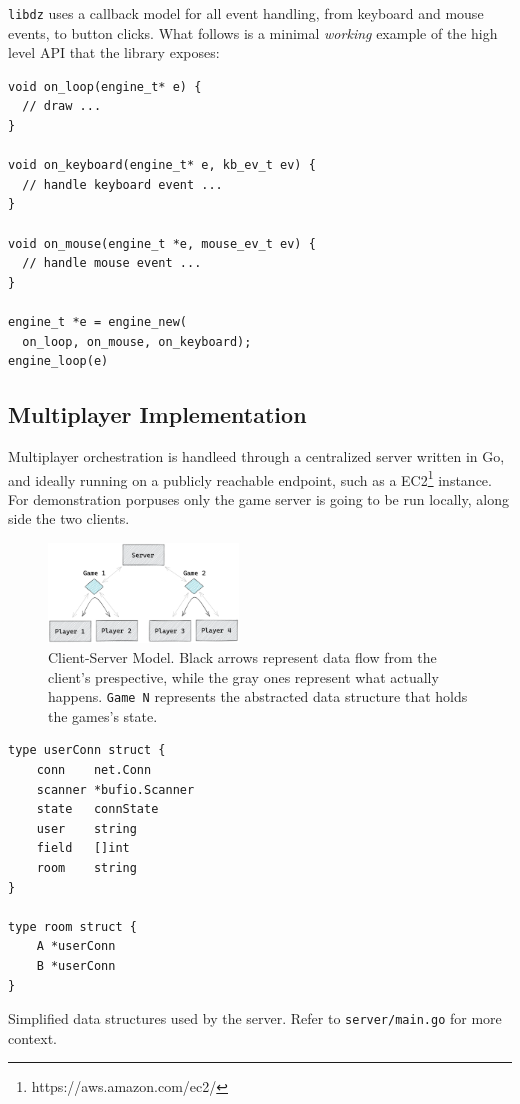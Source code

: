 \documentclass{report}
\begin{document}
\texttt{libdz} uses a callback model for all event handling, from keyboard and mouse events, to button clicks. What follows is a minimal \textit{working} example of the high level API that the library exposes:

\begin{verbatim}
void on_loop(engine_t* e) {
  // draw ...
}

void on_keyboard(engine_t* e, kb_ev_t ev) {
  // handle keyboard event ...
}

void on_mouse(engine_t *e, mouse_ev_t ev) {
  // handle mouse event ...
}

engine_t *e = engine_new(
  on_loop, on_mouse, on_keyboard);
engine_loop(e)
\end{verbatim}

\subsection{Multiplayer Implementation}

Multiplayer orchestration is handleed through a centralized server written in Go, and ideally running on a publicly reachable endpoint, such as a EC2\footnote{https://aws.amazon.com/ec2/} instance.
For demonstration porpuses only the game server is going to be run locally, along side the two clients.

\begin{figure}[h]
\centering\includegraphics[width=0.45\textwidth]{infra.png}
\caption{Client-Server Model. Black arrows represent data flow from the client's prespective, while the gray ones represent what actually happens. \texttt{Game N} represents the abstracted data structure that holds the games's state.}
\end{figure}

\begin{listing}[h]
\begin{verbatim}
type userConn struct {
	conn    net.Conn
	scanner *bufio.Scanner
	state   connState
	user    string
	field   []int
	room    string
}

type room struct {
	A *userConn
	B *userConn
}
\end{verbatim}
\caption{Simplified data structures used by the server. Refer to \texttt{server/main.go} for more context.}
\end{listing}
\end{document}
